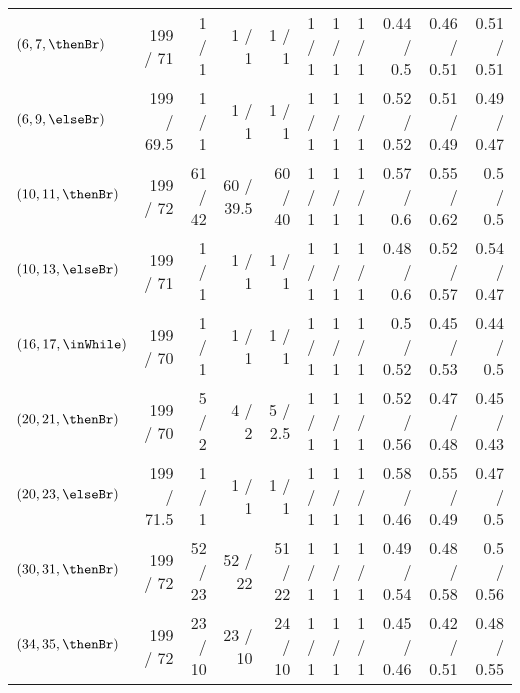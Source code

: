 \begin{table*}
{\begin{tabular}{l|rrrr|r|r|r|r|r|r}
    $(6,7,\thenBr)$      & 199  / 71   & 1   / 1  & 1   / 1     & 1   / 1    & 1 / 1 & 1 / 1 & 1 / 1 & 0.44 / 0.5 & 0.46 / 0.51 & 0.51 / 0.51 \\
    $(6,9,\elseBr)$      & 199  / 69.5 & 1   / 1  & 1   / 1     & 1   / 1    & 1 / 1 & 1 / 1 & 1 / 1 & 0.52 / 0.52 & 0.51 / 0.49 & 0.49 / 0.47 \\
    $(10,11,\thenBr)$    & 199  / 72   & 61  / 42 & 60  / 39.5  & 60  / 40   & 1 / 1 & 1 / 1 & 1 / 1 & 0.57 / 0.6 & 0.55 / 0.62  & 0.5 / 0.5 \\
    $(10,13,\elseBr)$    & 199  / 71   & 1   / 1  & 1   / 1     & 1   / 1    & 1 / 1 & 1 / 1 & 1 / 1 & 0.48 / 0.6 & 0.52 / 0.57 & 0.54 / 0.47 \\
    $(16,17,\inWhile)$   & 199  / 70   & 1   / 1  & 1   / 1     & 1   / 1    & 1 / 1 & 1 / 1 & 1 / 1 & 0.5 / 0.52 & 0.45 / 0.53 & 0.44 / 0.5 \\
    $(20,21,\thenBr)$    & 199  / 70   & 5   / 2  & 4   / 2     & 5   / 2.5  & 1 / 1 & 1 / 1 & 1 / 1 & 0.52 / 0.56 & 0.47 / 0.48 & 0.45 / 0.43 \\
    $(20,23,\elseBr)$    & 199  / 71.5 & 1   / 1  & 1   / 1     & 1   / 1    & 1 / 1 & 1 / 1 & 1 / 1 & 0.58 / 0.46 & 0.55 / 0.49 & 0.47 / 0.5 \\
    $(30,31,\thenBr)$    & 199  / 72   & 52  / 23 & 52  / 22    & 51  / 22   & 1 / 1 & 1 / 1 & 1 / 1 & 0.49 / 0.54 & 0.48 / 0.58 & 0.5 / 0.56 \\
    $(34,35,\thenBr)$    & 199  / 72   & 23  / 10 & 23  / 10    & 24  / 10   & 1 / 1 & 1 / 1 & 1 / 1 & 0.45 / 0.46 & 0.42 / 0.51 & 0.48 / 0.55 \\
    \bottomrule
    \end{tabular}
}
\end{table*}
